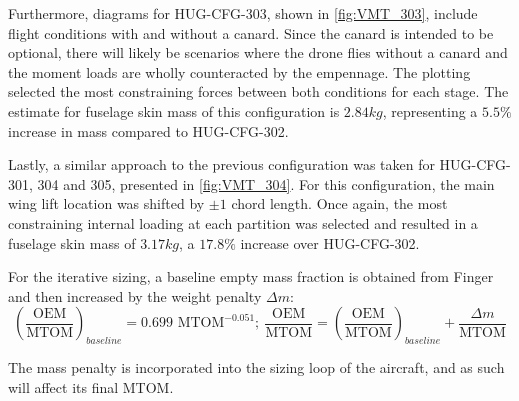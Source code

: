 Furthermore, diagrams for HUG-CFG-303, shown in \autoref{fig:VMT_303}, include flight conditions with and without a canard. Since the canard is intended to be optional, there will likely be scenarios where the drone flies without a canard and the moment loads are wholly counteracted by the empennage. The plotting selected the most constraining forces between both conditions for each stage. The estimate for fuselage skin mass of this configuration is $2.84kg$, representing a $5.5\%$ increase in mass compared to HUG-CFG-302.

Lastly, a similar approach to the previous configuration was taken for HUG-CFG-301, 304 and 305, presented in \autoref{fig:VMT_304}. For this configuration, the main wing lift location was shifted by $\pm 1$ chord length. Once again, the most constraining internal loading at each partition was selected and resulted in a fuselage skin mass of $3.17kg$, a $17.8\%$ increase over HUG-CFG-302.

For the iterative sizing, a baseline empty mass fraction is obtained from Finger \cite{Finger2016VTOL} and then increased by the weight penalty $\Delta m$:
\begin{equation}
    \left(\frac{\text{OEM}}{\text{MTOM}}\right)_{baseline}=0.699\text{ MTOM}^{-0.051};\ \frac{\text{OEM}}{\text{MTOM}}=\left(\frac{\text{OEM}}{\text{MTOM}}\right)_{baseline}+\frac{\Delta m}{\text{MTOM}}
\end{equation}

The mass penalty is incorporated into the sizing loop of the aircraft, and as such will affect its final MTOM.

